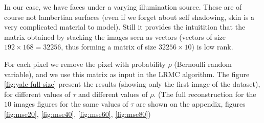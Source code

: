 \documentclass[a4paper, 11pt]{article}
\begin{document}
In our case, we have faces under a varying illumination source. These
are of course not lambertian surfaces (even if we forget about self
shadowing, skin is a very complicated material to model). Still it
provides the intuitition that the matrix obtained by stacking the
images seen as vectors (vectors of size $192 \times 168 = 32256$, thus
forming a matrix of size $32256 \times 10$) is low rank.

For each pixel we remove the pixel with probability $\rho$ (Bernoulli
random variable), and we use this matrix as input in the LRMC
algorithm. The figure \ref{fig:yale-full-size} present the results
(showing only the first image of the dataset), for different values of
$\tau$ and different values of $\rho$. (The full reconstruction for the
$10$ images figures for the same values of $\tau$ are shown on the
appendix, figures \ref{fig:mse20}, \ref{fig:mse40}, \ref{fig:mse60},
\ref{fig:mse80})
\end{document}

